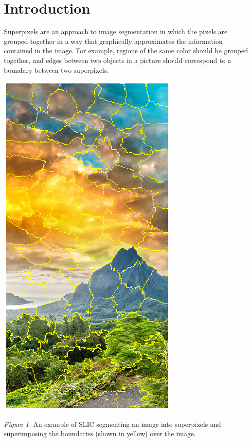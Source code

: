 \documentclass[11pt,twocolumn]{article}
\begin{document}
\section {Introduction} 


Superpixels are an approach to image segmentation in which the pixels are grouped together in a way that graphically approximates the information contained in the image. For example, regions of the same color should be grouped together, and edges between two objects in a picture should correspond to a boundary between two superpixels. 

\begin{center}
\includegraphics[width = 0.6\linewidth]{mountain100.png} \\
\end{center}
\textit{Figure 1.} An example of SLIC segmenting an image into superpixels and superimposing the boundaries (shown in yellow) over the image. \\
\end{document}
